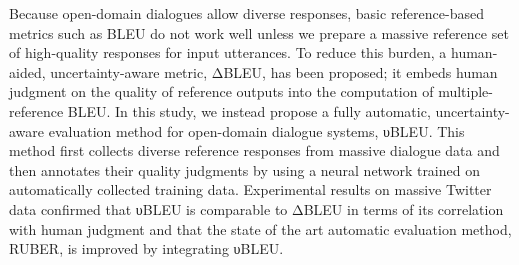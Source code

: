 Because open-domain dialogues allow diverse responses, basic reference-based metrics such as BLEU do not work well unless we prepare a massive reference set of high-quality responses for input utterances. To reduce this burden, a human-aided, uncertainty-aware metric, ΔBLEU, has been proposed;  it embeds human judgment on the quality of reference outputs into the computation of multiple-reference BLEU. In this study, we instead propose a fully automatic, uncertainty-aware evaluation method for open-domain dialogue systems, υBLEU. This method first collects diverse reference responses from massive dialogue data and then annotates their quality judgments by using a neural network trained on automatically collected training data. Experimental results on massive Twitter data confirmed that υBLEU is comparable to ΔBLEU in terms of its correlation with human judgment and that the state of the art automatic evaluation method, RUBER, is improved by integrating υBLEU.

